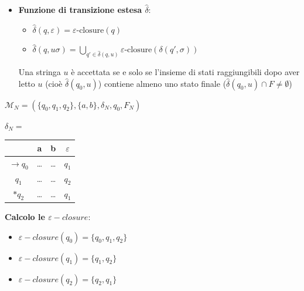 \documentclass[12pt, a4paper]{report}
\begin{document}
\begin{itemize}
\begin{itemize}
                        \item \textbf{Funzione di transizione estesa $\hat{\delta}$}: \begin{itemize}
                            \item $\hat{\delta}(q, \varepsilon) = \varepsilon\text{-closure}(q)$
                            \item $\hat{\delta}(q, u\sigma) = \bigcup_{q' \in \hat{\delta}(q, u)} \varepsilon\text{-closure}(\delta(q', \sigma))$
                        \end{itemize}
                        Una stringa $u$ è accettata se e solo se l'insieme di stati raggiungibili dopo aver letto $u$ (cioè $\hat{\delta}(q_0, u)$) contiene almeno uno stato finale ($\hat{\delta}(q_0, u) \cap F \neq \emptyset$)
                    \end{itemize}
                \end{itemize}
                \begin{example}
                    $\mathcal{M}_N=(\{q_0,q_1,q_2\},\{a,b\},\delta_N,q_0,F_N)$
                    \begin{center}
                        $\delta_N=$ \begin{tabular}{|c|c|c|c|}
                            \hline
                             & a & b & $\varepsilon$\\
                            \hline
                            $\to q_0$ & \ldots & \ldots & $q_1$\\
                            \hline
                            $q_1$ & \ldots & \ldots & $q_2$\\
                            \hline
                            $*q_2$ & \ldots & \ldots & $q_1$\\
                            \hline
                        \end{tabular}
                    \end{center}
                    \textbf{Calcolo le $\varepsilon-closure$}: \begin{itemize}
                        \item $\varepsilon-closure(q_0)=\{q_0,q_1,q_2\}$
                        \item $\varepsilon-closure(q_1)=\{q_1,q_2\}$
                        \item $\varepsilon-closure(q_2)=\{q_2,q_1\}$
                    \end{itemize}
                \end{example}
\end{document}
